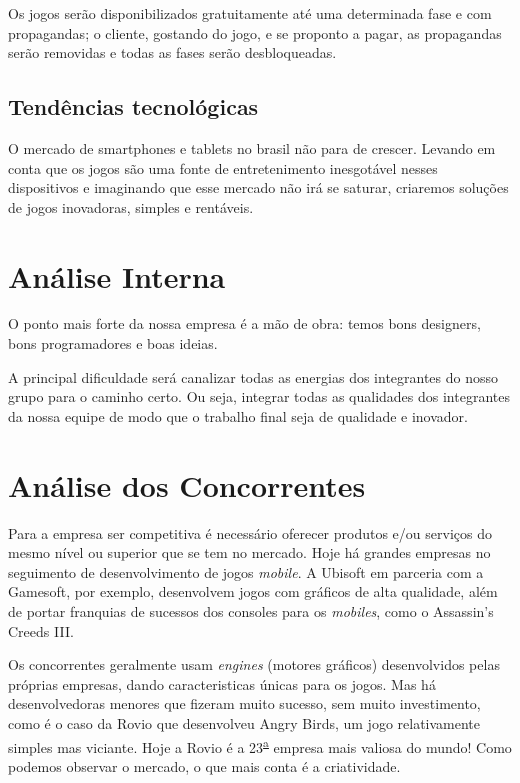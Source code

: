 \documentclass{abnt}
\begin{document}
		Os jogos serão disponibilizados gratuitamente até uma determinada fase e
		com propagandas; o cliente, gostando do jogo, e se proponto a pagar, as 
		propagandas serão removidas e todas as fases serão desbloqueadas.

		\section {Tendências tecnológicas}
		O mercado de smartphones e tablets no brasil não para de crescer. 
		Levando em conta que os jogos são uma fonte de entretenimento inesgotável
		nesses dispositivos e imaginando que esse mercado não irá se saturar, 
		criaremos soluções de jogos inovadoras, simples e rentáveis.


	\chapter {Análise Interna}
		O ponto mais forte da nossa empresa é a mão de obra: temos bons designers,  
		bons programadores e boas ideias.

		A principal dificuldade será canalizar todas as energias dos integrantes 
		do nosso grupo para o caminho certo. Ou seja, integrar todas as qualidades
		dos integrantes da nossa equipe de modo que o trabalho final seja de
		qualidade e inovador.

	\chapter {Análise dos Concorrentes}
	
		Para a empresa ser competitiva é necessário oferecer produtos e/ou serviços do mesmo nível ou superior que se tem no mercado.
		Hoje há grandes empresas no seguimento de desenvolvimento de jogos \textit{mobile}. A Ubisoft\textsuperscript{\texttrademark} em parceria com a Gamesoft\textsuperscript{\texttrademark}, por exemplo, desenvolvem jogos com gráficos de alta qualidade, além de portar franquias de sucessos dos consoles para os \textit{mobiles}, como o Assassin's Creeds III\textsuperscript{\textregistered}.
	
		Os concorrentes geralmente usam \textit{engines} (motores gráficos) desenvolvidos pelas próprias empresas, dando caracteristicas únicas para os jogos.
		Mas há desenvolvedoras menores que fizeram muito sucesso, sem muito investimento, como é o caso da Rovio que desenvolveu Angry Birds\textsuperscript{\textregistered}, um jogo relativamente simples mas viciante. Hoje a Rovio é a  23\textsuperscript{\underline{a}} empresa mais valiosa do mundo!
	Como podemos observar o mercado, o que mais conta é a criatividade.
\end{document}

